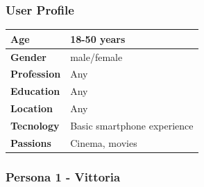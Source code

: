 \documentclass[12pt, a4paper]{article}
\begin{document}
\subsubsection{User Profile}

\begin{center}
	\begin{tabular}{ |p{3cm}|P{7cm}|  }
		\hline
		\textbf{Age}        & 18-50 years                 \\
		\hline
		\textbf{Gender}     & male/female                 \\
		\hline
		\textbf{Profession} & Any                         \\
		\hline
		\textbf{Education}  & Any                         \\
		\hline
		\textbf{Location}   & Any                         \\
		\hline
		\textbf{Tecnology}  & Basic smartphone experience \\
		\hline
		\textbf{Passions}   & Cinema, movies              \\
		\hline
	\end{tabular}
\end{center}

\subsubsection{Persona 1 - Vittoria}
\end{document}
